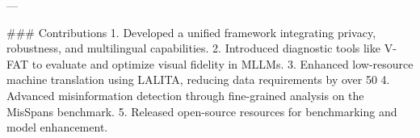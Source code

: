 ---

### Contributions
1. Developed a unified framework integrating privacy, robustness, and multilingual capabilities.
2. Introduced diagnostic tools like V-FAT to evaluate and optimize visual fidelity in MLLMs.
3. Enhanced low-resource machine translation using LALITA, reducing data requirements by over 50%
4. Advanced misinformation detection through fine-grained analysis on the MisSpans benchmark.
5. Released open-source resources for benchmarking and model enhancement.

